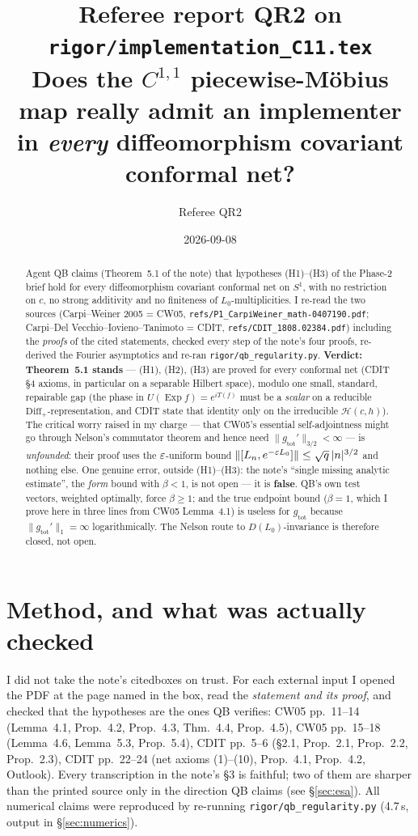 \documentclass[11pt]{article}
\title{\color{navy}\bfseries Referee report QR2 on \texttt{rigor/implementation\_C11.tex}\\[0.3em]
\large Does the $C^{1,1}$ piecewise-M\"obius map really admit an implementer in \emph{every}
diffeomorphism covariant conformal net?}
\author{Referee QR2}\date{2026-09-08}
\newcommand{\Hil}{\mathcal H}
\newcommand{\Diff}{\mathrm{Diff}_+}
\newcommand{\nrm}[1]{\lVert #1\rVert}
\newcommand{\abz}[1]{\lvert #1\rvert}
\newcommand{\gtot}{g_{\mathrm{tot}}}
\newcommand{\Exp}{\operatorname{Exp}}
\begin{document}
\maketitle
\vspace{-1.0em}

\begin{abstract}\noindent
Agent QB claims (Theorem~5.1 of the note) that hypotheses (H1)--(H3) of the Phase-2 brief hold for every
diffeomorphism covariant conformal net on $S^1$, with no restriction on $c$, no strong additivity and no
finiteness of $L_0$-multiplicities.  I re-read the two sources (Carpi--Weiner 2005 = CW05,
\texttt{refs/P1\_CarpiWeiner\_math-0407190.pdf}; Carpi--Del Vecchio--Iovieno--Tanimoto = CDIT,
\texttt{refs/CDIT\_1808.02384.pdf}) including the \emph{proofs} of the cited statements, checked every step of
the note's four proofs, re-derived the Fourier asymptotics and re-ran \texttt{rigor/qb\_regularity.py}.
\textbf{Verdict: Theorem~5.1 stands} --- (H1), (H2), (H3) are proved for every conformal net (CDIT \S4 axioms,
in particular on a separable Hilbert space), modulo one small, standard, repairable gap (the phase in
$U(\Exp f)=e^{iT(f)}$ must be a \emph{scalar} on a reducible $\Diff$-representation, and CDIT state that identity
only on the irreducible $\Hil(c,h)$).  The critical worry raised in my charge --- that CW05's essential
self-adjointness might go through Nelson's commutator theorem and hence need $\nrm{\gtot'}_{3/2}<\infty$ ---
is \emph{unfounded}: their proof uses the $\varepsilon$-uniform bound $\nrm{[L_n,e^{-\eps L_0}]}\le\sqrt q\,\abz n^{3/2}$
and nothing else.  One genuine error, outside (H1)--(H3): the note's ``single missing analytic estimate'', the
\emph{form} bound with $\beta<1$, is not open --- it is \textbf{false}.  QB's own test vectors, weighted
optimally, force $\beta\ge1$; and the true endpoint bound ($\beta=1$, which I prove here in three lines from
CW05 Lemma~4.1) is useless for $\gtot$ because $\nrm{\gtot'}_1=\infty$ logarithmically.  The Nelson route to
$D(L_0)$-invariance is therefore closed, not open.
\end{abstract}

\tableofcontents

\section{Method, and what was actually checked}\label{sec:method}

I did not take the note's citedboxes on trust.  For each external input I opened the PDF at the page named in
the box, read the \emph{statement and its proof}, and checked that the hypotheses are the ones QB verifies:
CW05 pp.~11--14 (Lemma~4.1, Prop.~4.2, Prop.~4.3, Thm.~4.4, Prop.~4.5), CW05 pp.~15--18 (Lemma~4.6, Lemma~5.3,
Prop.~5.4), CDIT pp.~5--6 (\S2.1, Prop.~2.1, Prop.~2.2, Prop.~2.3), CDIT pp.~22--24 (net axioms (1)--(10),
Prop.~4.1, Prop.~4.2, Outlook).  Every transcription in the note's \S3 is faithful; two of them are sharper than
the printed source only in the direction QB claims (see \S\ref{sec:esa}).  All numerical claims were reproduced
by re-running \texttt{rigor/qb\_regularity.py} (4.7\,s, output in \S\ref{sec:numerics}).
\end{document}
